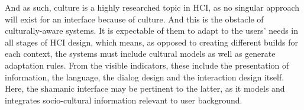    And as such, culture is a highly researched topic in HCI, as no singular approach will exist for an interface because of culture. And this is the obstacle of culturally-aware systems. It is expectable of them to adapt to the users’ needs in all stages of HCI design, which means, as opposed to creating different builds for each context, the systems must include cultural models as well as generate adaptation rules. From the visible indicators, these include the presentation of information, the language, the dialog design and the interaction design itself\cite{duncker2013}\cite{erumban2006}.\\ 
    Here, the shamanic interface may be pertinent to the latter, as it models and integrates socio-cultural information relevant to user background.\\



